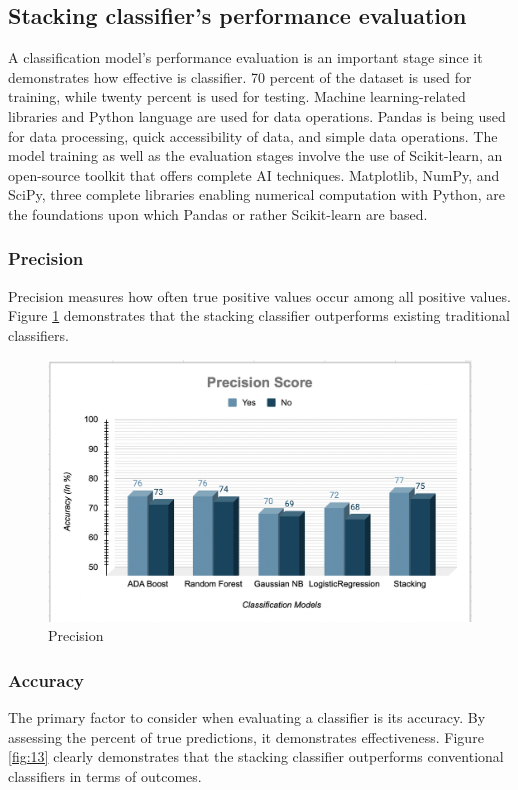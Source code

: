 \documentclass[10pt]{article}
\begin{document}
\subsection{Stacking classifier's performance evaluation}
A classification model's performance evaluation is an important stage since it demonstrates how effective is classifier. 
70 percent of the dataset is used for training, while twenty percent is used for testing. Machine learning-related libraries and Python language are used for data operations. Pandas is being used for data processing, quick accessibility of data, and simple data operations. The model training as well as the evaluation stages involve the use of Scikit-learn, an open-source toolkit that offers complete AI techniques. Matplotlib, NumPy, and SciPy, three complete libraries enabling numerical computation with Python, are the foundations upon which Pandas or rather Scikit-learn are based.

\subsubsection{Precision}
Precision measures how often true positive values occur among all positive values. Figure \ref{fig:14} demonstrates that the stacking classifier outperforms existing traditional classifiers.
\begin{figure}[H]
    \begin{center}
        \includegraphics[width=0.7\linewidth,frame]{CA2-template/RIC14.png}
       \caption{Precision \label{fig:14}}
    \end{center}
\end{figure}


\subsubsection{Accuracy}
The primary factor to consider when evaluating a classifier is its accuracy. By assessing the percent of true predictions, it demonstrates effectiveness. Figure \ref{fig:13} clearly demonstrates that the stacking classifier outperforms conventional classifiers in terms of outcomes.
\end{document}
